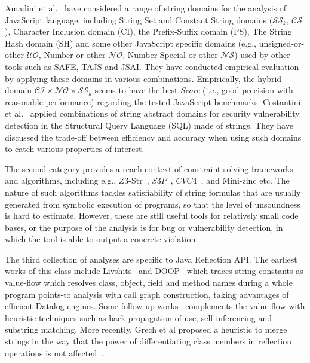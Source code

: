 \documentclass{llncs}
\begin{document}
Amadini et al.~\cite{Amadini17} have considered a range of string domains for the analysis of JavaScript language, including String Set and Constant String domains ($\mathcal{SS}_k$, $\mathcal{CS}$), Character Inclusion domain (CI), the Prefix-Suffix domain (PS), The String Hash domain (SH) and some other JavaScript specific domains (e.g., unsigned-or-other $\mathcal{UO}$, Number-or-other $\mathcal{NO}$, Number-Special-or-other $\mathcal{NS}$) used by other tools such as SAFE, TAJS and JSAI. They have conducted empirical evaluation by applying these domains in various combinations. Empirically, the hybrid domain $\mathcal{CI}\times\mathcal{NO}\times\mathcal{SS}_k$ seems to have the best \emph{Score} (i.e., good precision with reasonable performance) regarding the tested JavaScript benchmarks.
Costantini et al.~\cite{Costantini13} applied combinations of string abstract domains for security vulnerability detection in the Structural Query Language (SQL) made of strings. They have discussed the trade-off between efficiency and accuracy when using such domains to catch various properties of interest.

The second category provides a reach context of constraint solving frameworks and algorithms, including e.g., $Z3$-Str~\cite{z3str3}, $S3P$~\cite{TrinhCJ16}, $CVC4$~\cite{Barrett11}, and Mini-zinc etc. The nature of such algorithms tackles satisfiability of string formulas that are usually generated from symbolic execution of programs, so that the level of unsoundness is hard to estimate. However, these are still useful tools for relatively small code bases, or the purpose of the analysis is for bug or vulnerability detection, in which the tool is able to output a concrete violation. 

The third collection of analyses are specific to Java Reflection API. The earliest works of this class include Livshits~\cite{Livshits06} and DOOP~\cite{Bravenboer09} which traces string constants as value-flow which resolves class, object, field and method names during a whole program points-to analysis with call graph construction, taking advantages of efficient Datalog engines. Some follow-up works~\cite{LTSX14,Smaragdakis11} complements
the value flow with heuristic techniques such as back propagation of use, self-inferencing and substring matching. More recently, Grech et al proposed a heuristic to merge strings in the way that the power of differentiating class members in reflection operations is not affected~\cite{GrechKS18}.
\end{document}
